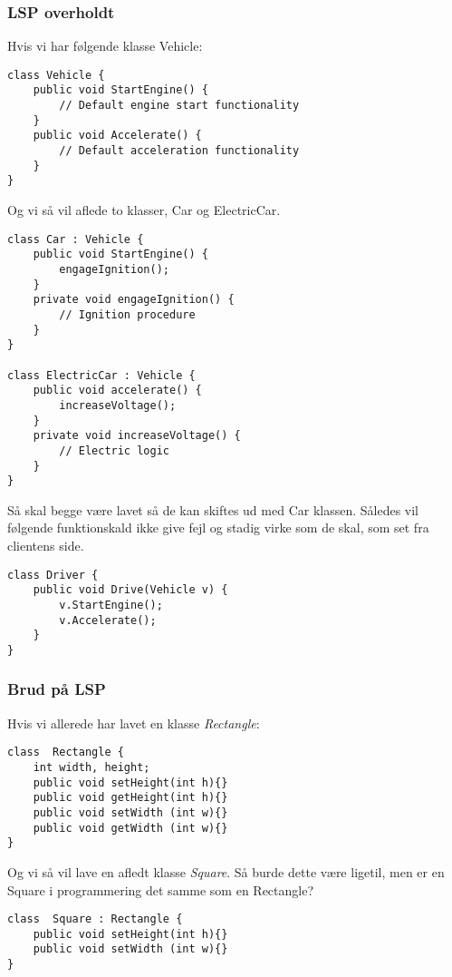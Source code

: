 \subsubsection{LSP overholdt}
Hvis vi har følgende klasse Vehicle:

\begin{lstlisting}
class Vehicle {
	public void StartEngine() {
		// Default engine start functionality
	}
	public void Accelerate() {
		// Default acceleration functionality
	}
}
\end{lstlisting}

Og vi så vil aflede to klasser, Car og ElectricCar.

\begin{lstlisting}
class Car : Vehicle {
	public void StartEngine() {
		engageIgnition();
	}
	private void engageIgnition() {
		// Ignition procedure
	}
}

class ElectricCar : Vehicle {
	public void accelerate() {
		increaseVoltage();
	}
	private void increaseVoltage() {
		// Electric logic
	}
}
\end{lstlisting}

Så skal begge være lavet så de kan skiftes ud med Car klassen. Således vil følgende funktionskald ikke give fejl og stadig virke som de skal, som set fra clientens side.

\begin{lstlisting}
class Driver {
	public void Drive(Vehicle v) {
		v.StartEngine();
		v.Accelerate();
	}
}
\end{lstlisting}

\subsubsection{Brud på LSP}
Hvis vi allerede har lavet en klasse \textit{Rectangle}:

\begin{lstlisting}
class  Rectangle {
	int width, height;
	public void setHeight(int h){}
	public void getHeight(int h){}
	public void setWidth (int w){}
	public void getWidth (int w){}
}
\end{lstlisting}

Og vi så vil lave en afledt klasse \textit{Square}. Så burde dette være ligetil, men er en Square i programmering det samme som en Rectangle?

\begin{lstlisting}
class  Square : Rectangle {
	public void setHeight(int h){}
	public void setWidth (int w){}
}
\end{lstlisting}

